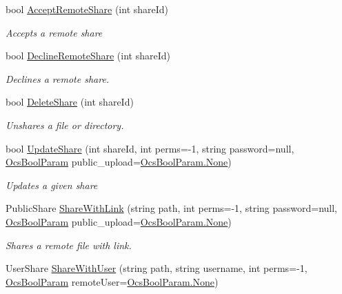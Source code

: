 \begin{DoxyCompactItemize}
bool \hyperlink{classowncloudsharp_1_1_client_ace55eb0544bda9803e493dd80af14970}{Accept\+Remote\+Share} (int share\+Id)
\begin{DoxyCompactList}\small\item\em Accepts a remote share \end{DoxyCompactList}\item 
bool \hyperlink{classowncloudsharp_1_1_client_a8936411abf14870d211e4a62be3d7840}{Decline\+Remote\+Share} (int share\+Id)
\begin{DoxyCompactList}\small\item\em Declines a remote share. \end{DoxyCompactList}\item 
bool \hyperlink{classowncloudsharp_1_1_client_a7499d8f0c4fae0b22da4a35327547cca}{Delete\+Share} (int share\+Id)
\begin{DoxyCompactList}\small\item\em Unshares a file or directory. \end{DoxyCompactList}\item 
bool \hyperlink{classowncloudsharp_1_1_client_a096e6b5540091d8b3f296d899f4807dd}{Update\+Share} (int share\+Id, int perms=-\/1, string password=null, \hyperlink{namespaceowncloudsharp_a7d494b18f174086318df1bdf916068b5}{Ocs\+Bool\+Param} public\+\_\+upload=\hyperlink{namespaceowncloudsharp_a86ba7b86b85c7f5be2304a1ef7ae3157a6adf97f83acf6453d4a6a4b1070f3754}{Ocs\+Bool\+Param.\+None})
\begin{DoxyCompactList}\small\item\em Updates a given share \end{DoxyCompactList}\item 
Public\+Share \hyperlink{classowncloudsharp_1_1_client_ac44012d849ddbbbdab86509344d6504d}{Share\+With\+Link} (string path, int perms=-\/1, string password=null, \hyperlink{namespaceowncloudsharp_a7d494b18f174086318df1bdf916068b5}{Ocs\+Bool\+Param} public\+\_\+upload=\hyperlink{namespaceowncloudsharp_a86ba7b86b85c7f5be2304a1ef7ae3157a6adf97f83acf6453d4a6a4b1070f3754}{Ocs\+Bool\+Param.\+None})
\begin{DoxyCompactList}\small\item\em Shares a remote file with link. \end{DoxyCompactList}\item 
User\+Share \hyperlink{classowncloudsharp_1_1_client_a69d7df9c2e91b8716bb0c5a2f5ff7878}{Share\+With\+User} (string path, string username, int perms=-\/1, \hyperlink{namespaceowncloudsharp_a7d494b18f174086318df1bdf916068b5}{Ocs\+Bool\+Param} remote\+User=\hyperlink{namespaceowncloudsharp_a86ba7b86b85c7f5be2304a1ef7ae3157a6adf97f83acf6453d4a6a4b1070f3754}{Ocs\+Bool\+Param.\+None})

\end{DoxyCompactItemize}
